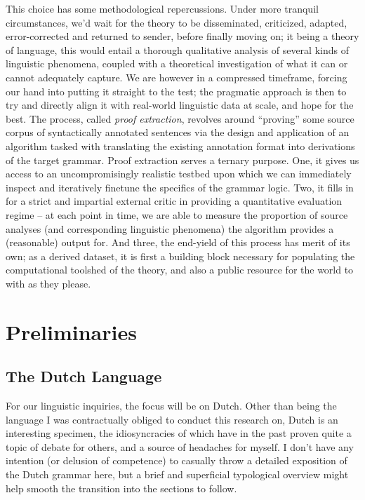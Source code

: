 This choice has some methodological repercussions.
Under more tranquil circumstances, we'd wait for the theory to be disseminated, criticized, adapted, error-corrected and returned to sender, before finally moving on; it being a theory of language, this would entail a thorough qualitative analysis of several kinds of linguistic phenomena, coupled with a theoretical investigation of what it can or cannot adequately capture.
We are however in a compressed timeframe, forcing our hand into putting it straight to the test; the pragmatic approach is then to try and directly align it with real-world linguistic data at scale, and hope for the best.
The process, called \textit{proof extraction}, revolves around ``proving''  some source corpus of syntactically annotated sentences via the design and application of an algorithm tasked with translating the existing annotation format into derivations of the target grammar.
Proof extraction serves a ternary purpose.
One, it gives us access to an uncompromisingly realistic testbed upon which we can immediately inspect and iteratively finetune the specifics of the grammar logic.
Two, it fills in for a strict and impartial external critic in providing a quantitative evaluation regime -- at each point in time, we are able to measure the proportion of source analyses (and corresponding linguistic phenomena) the algorithm provides a (reasonable) output for.
And three, the end-yield of this process has merit of its own; as a derived dataset, it is first a building block necessary for populating the computational toolshed of the theory, and also a public resource for the world to with as they please.

\section{Preliminaries}

\subsection{The Dutch Language}
For our linguistic inquiries, the focus will be on Dutch.
Other than being the language I was contractually obliged to conduct this research on, Dutch is an interesting specimen, the idiosyncracies of which have in the past proven quite a topic of debate for others, and a source of headaches for myself.
I don't have any intention (or delusion of competence) to casually throw a detailed exposition of the Dutch grammar here, but a brief and superficial typological overview might help smooth the transition into the sections to follow.

